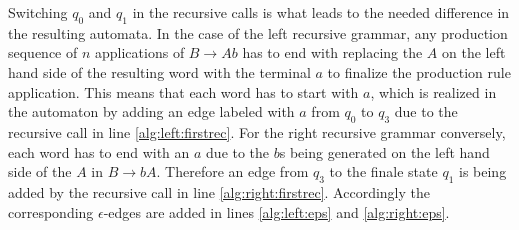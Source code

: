 Switching $q_0$ and $q_1$ in the recursive calls is what leads to the needed difference in the resulting automata. In the case of the left recursive grammar, any production sequence of $n$ applications of $B \rightarrow Ab$ has to end with replacing the $A$ on the left hand side of the resulting word with the terminal $a$ to finalize the production rule application. This means that each word has to start with $a$, which is realized in the automaton by adding an edge labeled with $a$ from $q_0$ to $q_3$ due to the recursive call in line \ref{alg:left:firstrec}. For the right recursive grammar conversely, each word has to end with an $a$ due to the $b$s being generated on the left hand side of the $A$ in $B \rightarrow bA$. Therefore an edge from $q_3$ to the finale state $q_1$ is being added by the recursive call in line \ref{alg:right:firstrec}.
Accordingly the corresponding $\epsilon$-edges are added in lines \ref{alg:left:eps} and \ref{alg:right:eps}.


